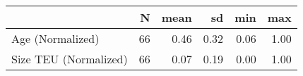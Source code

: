 
\begin{tabular}[t]{lrrrrr}
\toprule
  & N & mean & sd & min & max\\
\midrule
Age (Normalized) & 66 & 0.46 & 0.32 & 0.06 & 1.00\\
Size TEU (Normalized) & 66 & 0.07 & 0.19 & 0.00 & 1.00\\
\bottomrule
\end{tabular}
